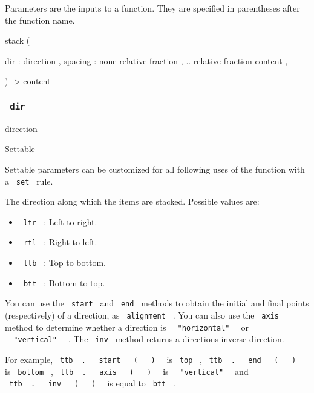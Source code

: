 \label{parameters-tooltip}
Parameters are the inputs to a function. They are specified in
parentheses after the function name.

{ stack } (

{ \hyperref[parameters-dir]{dir :}
\href{/docs/reference/layout/direction/}{direction} , } {
\hyperref[parameters-spacing]{spacing :}
\href{/docs/reference/foundations/none/}{none}
\href{/docs/reference/layout/relative/}{relative}
\href{/docs/reference/layout/fraction/}{fraction} , } {
\hyperref[parameters-children]{..}
\href{/docs/reference/layout/relative/}{relative}
\href{/docs/reference/layout/fraction/}{fraction}
\href{/docs/reference/foundations/content/}{content} , }

) -\textgreater{} \href{/docs/reference/foundations/content/}{content}

\subsubsection{\texorpdfstring{\texttt{\ dir\ }}{ dir }}\label{parameters-dir}

\href{/docs/reference/layout/direction/}{direction}

{{ Settable }}

\label{parameters-dir-settable-tooltip}
Settable parameters can be customized for all following uses of the
function with a \texttt{\ set\ } rule.

The direction along which the items are stacked. Possible values are:

\begin{itemize}
\tightlist
\item
  \texttt{\ ltr\ } : Left to right.
\item
  \texttt{\ rtl\ } : Right to left.
\item
  \texttt{\ ttb\ } : Top to bottom.
\item
  \texttt{\ btt\ } : Bottom to top.
\end{itemize}

You can use the \texttt{\ start\ } and \texttt{\ end\ } methods to
obtain the initial and final points (respectively) of a direction, as
\texttt{\ alignment\ } . You can also use the \texttt{\ axis\ } method
to determine whether a direction is
\texttt{\ }{\texttt{\ "horizontal"\ }}\texttt{\ } or
\texttt{\ }{\texttt{\ "vertical"\ }}\texttt{\ } . The \texttt{\ inv\ }
method returns a direction\textquotesingle s inverse direction.

For example,
\texttt{\ ttb\ }{\texttt{\ .\ }}\texttt{\ }{\texttt{\ start\ }}\texttt{\ }{\texttt{\ (\ }}\texttt{\ }{\texttt{\ )\ }}\texttt{\ }
is \texttt{\ top\ } ,
\texttt{\ ttb\ }{\texttt{\ .\ }}\texttt{\ }{\texttt{\ end\ }}\texttt{\ }{\texttt{\ (\ }}\texttt{\ }{\texttt{\ )\ }}\texttt{\ }
is \texttt{\ bottom\ } ,
\texttt{\ ttb\ }{\texttt{\ .\ }}\texttt{\ }{\texttt{\ axis\ }}\texttt{\ }{\texttt{\ (\ }}\texttt{\ }{\texttt{\ )\ }}\texttt{\ }
is \texttt{\ }{\texttt{\ "vertical"\ }}\texttt{\ } and
\texttt{\ ttb\ }{\texttt{\ .\ }}\texttt{\ }{\texttt{\ inv\ }}\texttt{\ }{\texttt{\ (\ }}\texttt{\ }{\texttt{\ )\ }}\texttt{\ }
is equal to \texttt{\ btt\ } .

